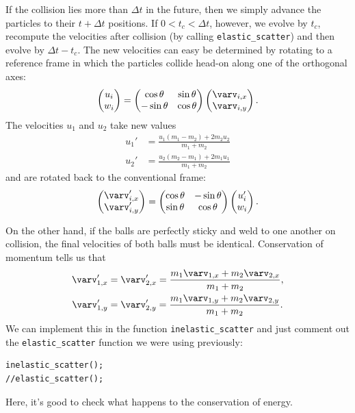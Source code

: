 \documentclass[11pt]{article}
\begin{document}
If the collision lies more than $\Delta t$ in the future, then we simply advance the particles to their $t+\Delta t$ positions.
If $0 < t_c < \Delta t$, however, we evolve by $t_c$, recompute the velocities after collision (by calling 
\verb!elastic_scatter!) and then evolve by $\Delta t - t_c$.
The new velocities can easy be determined by rotating to a reference frame in which the particles
collide head-on along one of the orthogonal axes:
\[ \begin{pmatrix}
u_i \\
w_i
\end{pmatrix}
= \begin{pmatrix}
\cos \theta & \sin \theta\\
-\sin \theta & \cos \theta
\end{pmatrix}
\begin{pmatrix}
\varv_{i,x}\\
\varv_{i,y}
\end{pmatrix}.
\]
The velocities $u_1$ and $u_2$ take new values
\begin{align*}
 u_1' &= \frac{u_1(m_1-m_2)+2m_2u_2}{m_1+m_2}\\
 u_2' &= \frac{u_2(m_2-m_1)+2m_1u_1}{m_1+m_2}
\end{align*}
and are rotated back to the conventional frame:
\[\begin{pmatrix}
\varv_{i,x}'\\
\varv_{i,y}'
\end{pmatrix}
= \begin{pmatrix}
\cos \theta & -\sin \theta\\
\sin \theta & \cos \theta
\end{pmatrix}
\begin{pmatrix}
u_i' \\
w_i
\end{pmatrix}.
\]

On the other hand, if the balls are perfectly sticky and weld to one another on collision, the final velocities of both balls must be identical. Conservation of momentum tells us that
\begin{align*}
\varv'_{1,x} &= \varv'_{2,x} = \frac{m_1\varv_{1,x} + m_2\varv_{2,x}}{m_1+m_2},\\
\varv'_{1,y} &= \varv'_{2,y} = \frac{m_1\varv_{1,y} + m_2\varv_{2,y}}{m_1+m_2}.
\end{align*}
We can implement this in the function \verb!inelastic_scatter!
and just comment out the \verb!elastic_scatter! function we were
using previously:
\small\begin{verbatim}
inelastic_scatter();
//elastic_scatter();
\end{verbatim}
Here, it's good to check what happens to the conservation of energy.
\end{document}
